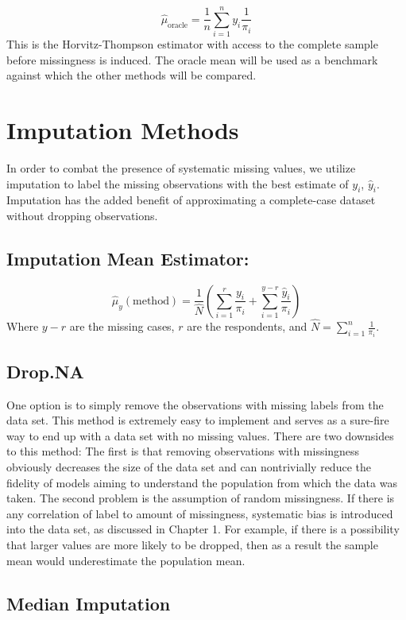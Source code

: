\documentclass[12pt,twoside]{reedthesis}
\begin{document}
\[
\hat \mu_{\text{oracle}} = \frac{1}{n} \sum_{i=1}^n y_i \frac{1}{\pi_i}
\] This is the Horvitz-Thompson estimator with access to the complete
sample before missingness is induced. The oracle mean will be used as a
benchmark against which the other methods will be compared.

\section{Imputation Methods}\label{imputation-methods}

In order to combat the presence of systematic missing values, we utilize
imputation to label the missing observations with the best estimate of
\(y_i\), \(\hat y_i\). Imputation has the added benefit of approximating
a complete-case dataset without dropping observations.

\subsection{Imputation Mean Estimator:}\label{imputation-mean-estimator}

\[
\hat \mu_y(\text{method}) = \frac{1}{\hat N} (\sum_{i=1}^{r} \frac{y_i}{\pi_i} + \sum_{i=1}^{y-r} \frac{\hat y_i}{\pi_i})
\] Where \(y-r\) are the missing cases, \(r\) are the respondents, and
\(\hat N = \sum_{i=1}^n \frac{1}{\pi_i}\).

\subsection{Drop.NA}\label{drop.na}

One option is to simply remove the observations with missing labels from
the data set. This method is extremely easy to implement and serves as a
sure-fire way to end up with a data set with no missing values. There
are two downsides to this method: The first is that removing
observations with missingness obviously decreases the size of the data
set and can nontrivially reduce the fidelity of models aiming to
understand the population from which the data was taken. The second
problem is the assumption of random missingness. If there is any
correlation of label to amount of missingness, systematic bias is
introduced into the data set, as discussed in Chapter 1. For example, if
there is a possibility that larger values are more likely to be dropped,
then as a result the sample mean would underestimate the population
mean.

\subsection{Median Imputation}\label{median-imputation}
\end{document}
